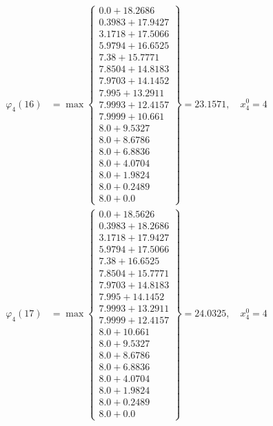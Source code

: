 \documentclass{article}
\begin{document}
\begin{align*}
\varphi_{4}(16) &= \max \left\{ \begin{array}{c}
0.0 + 18.2686 \\
 0.3983 + 17.9427 \\
 3.1718 + 17.5066 \\
 5.9794 + 16.6525 \\
 7.38 + 15.7771 \\
 7.8504 + 14.8183 \\
 7.9703 + 14.1452 \\
 7.995 + 13.2911 \\
 7.9993 + 12.4157 \\
 7.9999 + 10.661 \\
 8.0 + 9.5327 \\
 8.0 + 8.6786 \\
 8.0 + 6.8836 \\
 8.0 + 4.0704 \\
 8.0 + 1.9824 \\
 8.0 + 0.2489 \\
 8.0 + 0.0
\end{array} \right\}=23.1571, \quad x_{4}^0=4\\
  
\varphi_{4}(17) &= \max \left\{ \begin{array}{c}
0.0 + 18.5626 \\
 0.3983 + 18.2686 \\
 3.1718 + 17.9427 \\
 5.9794 + 17.5066 \\
 7.38 + 16.6525 \\
 7.8504 + 15.7771 \\
 7.9703 + 14.8183 \\
 7.995 + 14.1452 \\
 7.9993 + 13.2911 \\
 7.9999 + 12.4157 \\
 8.0 + 10.661 \\
 8.0 + 9.5327 \\
 8.0 + 8.6786 \\
 8.0 + 6.8836 \\
 8.0 + 4.0704 \\
 8.0 + 1.9824 \\
 8.0 + 0.2489 \\
 8.0 + 0.0
\end{array} \right\}=24.0325, \quad x_{4}^0=4\\
  

\end{align*}
\end{document}
